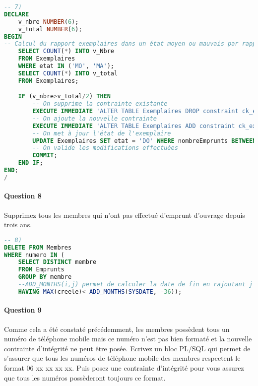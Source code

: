 \documentclass[10pt, oneside]{article}
\begin{document}
\begin{lstlisting}[language=sql, title=Question 7, label=QIV7]
-- 7)
DECLARE
	v_nbre NUMBER(6);
	v_total NUMBER(6);
BEGIN 
-- Calcul du rapport exemplaires dans un état moyen ou mauvais par rapport au nombre total d'exemplaires
	SELECT COUNT(*) INTO v_Nbre
	FROM Exemplaires
	WHERE etat IN ('MO', 'MA');
	SELECT COUNT(*) INTO v_total
	FROM Exemplaires;

	IF (v_nbre>v_total/2) THEN
		-- On supprime la contrainte existante
		EXECUTE IMMEDIATE 'ALTER TABLE Exemplaires DROP constraint ck_exemplaires_etat';
		-- On ajoute la nouvelle contrainte
		EXECUTE IMMEDIATE 'ALTER TABLE Exemplaires ADD constraint ck_exemplaires_etat CHECK etat IN (''NE'', ''BO'', ''MO'', ''DO'', ''MA'')';
		-- On met à jour l'état de l'exemplaire
		UPDATE Exemplaires SET etat = 'DO' WHERE nombreEmprunts BETWEEN 41 AND 60;
		-- On valide les modifications effectuées
		COMMIT;
	END IF;
END;
/
\end{lstlisting}


\paragraph{Question 8} Supprimez tous les membres qui n'ont pas effectué d'emprunt d'ouvrage depuis trois ans.

\begin{lstlisting}[language=sql, title=Question 8, label=QIV8]
-- 8)
DELETE FROM Membres
WHERE numero IN (
	SELECT DISTINCT membre
	FROM Emprunts
	GROUP BY membre
	--ADD_MONTHS(i,j) permet de calculer la date de fin en rajoutant j mois à la date i
	HAVING MAX(creele)< ADD_MONTHS(SYSDATE, -36));
\end{lstlisting}


\paragraph{Question 9} Comme cela a été constaté précédemment, les membres possèdent tous un numéro de téléphone mobile mais ce numéro n'est pas bien formaté et la nouvelle contrainte d'intégrité ne peut être posée.
Ecrivez un bloc PL/SQL qui permet de s'assurer que tous les numéros de téléphone mobile des membres respectent le format 06 xx xx xx xx. Puis posez une contrainte d'intégrité pour vous assurez que tous les numéros possèderont toujours ce format.
\end{document}
